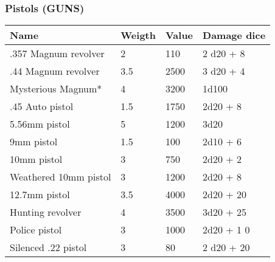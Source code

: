 
\subsubsection{Pistols (GUNS)}
\begin{longtable}{|p{4cm}|p{1.5cm}|p{1.5cm}|p{9cm}|}
\hline
\bfseries Name & \bfseries Weigth & \bfseries Value & \bfseries Damage dice \\
\hline
\endhead
.357 Magnum revolver & 2 & 110 & 2 d20 + 8 \\
.44 Magnum revolver & 3.5 & 2500 & 3 d20 + 4 \\
Mysterious Magnum* & 4 & 3200 & 1d100 \\
.45 Auto pistol & 1.5 & 1750 & 2d20 + 8 \\
5.56mm pistol & 5 & 1200 & 3d20 \\
9mm pistol & 1.5 & 100 & 2d10 + 6 \\
10mm pistol & 3 & 750 & 2d20 + 2 \\
Weathered 10mm pistol & 3 & 1200 & 2d20 + 8 \\
12.7mm pistol & 3.5 & 4000 & 2d20 + 20 \\
Hunting revolver & 4 & 3500 & 3d20 + 25 \\
Police pistol & 3 & 1000 & 2d20 + 1 0 \\
Silenced .22 pistol & 3 & 80 & 2 d20 + 20 \\
\hline
\end{longtable}
